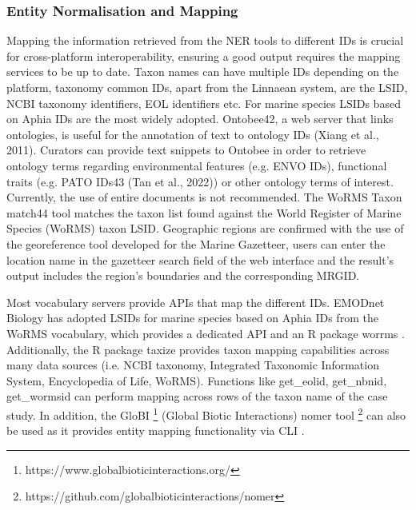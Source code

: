    \subsubsection{Entity Normalisation and Mapping}
   Mapping the information retrieved from the NER tools to different IDs is crucial for cross-platform interoperability, ensuring a good output requires the mapping services to be up to date.
Taxon names can have multiple IDs depending on the platform, taxonomy common IDs, apart from the Linnaean system, are the LSID, NCBI taxonomy identifiers, EOL identifiers etc. For marine species LSIDs based on Aphia IDs are the most widely adopted.
Ontobee42, a web server that links ontologies, is useful for the annotation of text to ontology IDs (Xiang et al., 2011). Curators can provide text snippets to Ontobee in order to retrieve ontology terms regarding environmental features (e.g. ENVO IDs), functional traits (e.g. PATO IDs43 (Tan et al., 2022)) or other ontology terms of interest. Currently, the use of entire documents is not recommended.
The WoRMS Taxon match44 tool matches the taxon list found against the World Register of Marine Species (WoRMS) taxon LSID. Geographic regions are confirmed with the use of the georeference tool developed for the Marine Gazetteer, users can enter the location name in the gazetteer search field of the web interface and the result’s output includes the region’s boundaries and the corresponding MRGID.

Most vocabulary servers provide APIs that map the different IDs. EMODnet Biology
has adopted LSIDs for marine species based on Aphia IDs from the
WoRMS vocabulary, which provides a dedicated API and an R package worrms
\citep{chamberlain_worrms_2020}. Additionally, the R package taxize
\citep{chamberlain_taxize_2013} provides taxon mapping capabilities across many
data sources (i.e. NCBI taxonomy, Integrated Taxonomic Information System,
Encyclopedia of Life, WoRMS). Functions like get\_eolid, get\_nbnid, get\_wormsid
can perform mapping across rows of the taxon name of the case study. In
addition, the GloBI \footnote{https://www.globalbioticinteractions.org/}
(Global Biotic Interactions) nomer tool
\footnote{https://github.com/globalbioticinteractions/nomer}
\citep{poelen_globalbioticinteractionsnomer_2022} can also be used as it
provides entity mapping functionality via CLI \citep{poelen_global_2014}.

